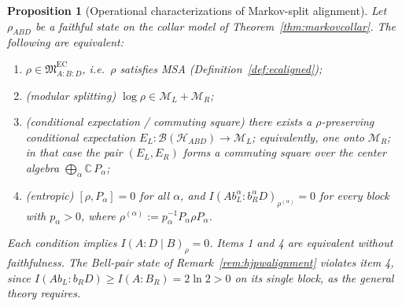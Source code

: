 \documentclass[11pt]{article}
\newtheorem{proposition}[theorem]{Proposition}
\begin{document}
\begin{proposition}[Operational characterizations of Markov-split alignment]\label{prop:msachar}
Let \(\rho_{ABD}\) be a faithful state on the collar model of Theorem~\ref{thm:markovcollar}. The following are equivalent:
\begin{enumerate}[leftmargin=2em]
\item \(\rho\in\mathfrak M^{\mathrm{EC}}_{A:B:D}\), i.e.\ \(\rho\) satisfies MSA (Definition~\ref{def:ecaligned});
\item \emph{(modular splitting)} \(\log\rho\in\mathcal M_L+\mathcal M_R\);
\item \emph{(conditional expectation / commuting square)} there exists a \(\rho\)-preserving conditional expectation \(E_L:\mathcal B(\mathcal H_{ABD})\to\mathcal M_L\); equivalently, one onto \(\mathcal M_R\); in that case the pair \((E_L,E_R)\) forms a commuting square over the center algebra \(\bigoplus_\alpha\mathbb C\,P_\alpha\);
\item \emph{(entropic)} \([\rho,P_\alpha]=0\) for all \(\alpha\), and \(I(Ab_L^\alpha:b_R^\alpha D)_{\rho^{(\alpha)}}=0\) for every block with \(p_\alpha>0\), where \(\rho^{(\alpha)}:=p_\alpha^{-1}P_\alpha\rho P_\alpha\).
\end{enumerate}
Each condition implies \(I(A:D\mid B)_\rho=0\). Items 1 and 4 are equivalent without faithfulness. The Bell-pair state of Remark~\ref{rem:hjpwalignment} violates item 4, since \(I(Ab_L:b_RD)\ge I(A:B_R)=2\ln2>0\) on its single block, as the general theory requires.
\end{proposition}
\end{document}
